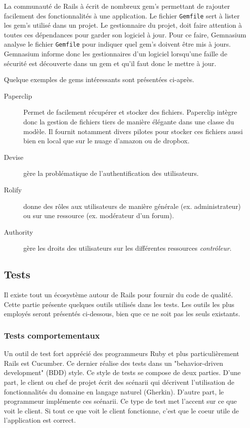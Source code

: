 La communauté de Rails à écrit de nombreux gem's permettant de rajouter facilement des fonctionnalités à une application. Le fichier \texttt{Gemfile} sert à lister les gem's utilisé dans un projet. Le gestionnaire du projet, doit faire attention à toutes ces dépendances pour garder son logiciel à jour. Pour ce faire, Gemnasium analyse le fichier \texttt{Gemfile} pour indiquer quel gem's doivent être mis à jours. Gemnasium informe donc les gestionnaires d'un logiciel lorsqu'une faille de sécurité est découverte dans un gem et qu'il faut donc le mettre à jour.

Quelque exemples de gems intéressants sont présentées ci-après.
\begin{description}
  \item[Paperclip] Permet de facilement récupérer et stocker des fichiers. Paperclip intègre donc la gestion de fichiers tiers de manière élégante dans une classe du modèle. Il fournit notamment divers pilotes pour stocker ces fichiers aussi bien en local que sur le nuage d'amazon ou de dropbox.
  \item[Devise] gère la problématique de l'authentification des utilisateurs.
  \item[Rolify] donne des rôles aux utilisateurs de manière générale (ex. administrateur) ou sur une ressource (ex. modérateur d'un forum).\label{rolify}
  \item[Authority] gère les droits des utilisateurs sur les différentes ressources \textit{contrôleur}. \label{authority}
\end{description}

\subsection{Tests}
\label{rails-tests}
Il existe tout un écosystème autour de Rails pour fournir du code de qualité. Cette partie présente quelques outils utilisés dans les tests. Les outils les plus employés seront présentés ci-dessous, bien que ce ne soit pas les seuls existants.

\subsubsection{Tests comportementaux}
\label{cucumber}
Un outil de test fort apprécié des programmeurs Ruby et plus particulièrement Rails est Cucumber. Ce dernier réalise des tests dans un "behavior-driven development" (BDD) style. Ce style de tests se compose de deux parties. D'une part, le client ou chef de projet écrit des scénarii qui décrivent l'utilisation de fonctionnalités du domaine en langage naturel (Gherkin). D'autre part, le programmeur implémente ces scénarii. Ce type de test met l'accent sur ce que voit le client. Si tout ce que voit le client fonctionne, c'est que le coeur utile de l'application est correct. 

